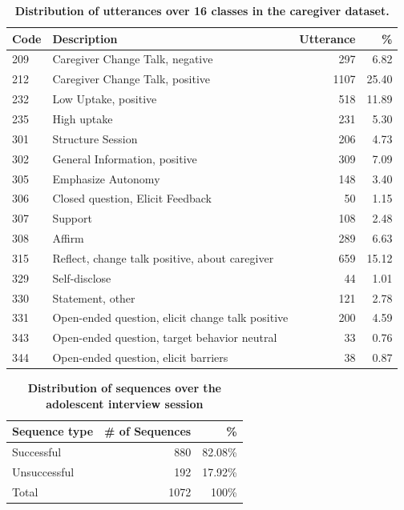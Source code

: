 \documentclass{amia}
\begin{document}
\begin{table}[htb!]
\caption{\textbf{Distribution of utterances over 16 classes in the caregiver dataset.}}    
\label{table:01}
\centering
\begin{tabular}{lp{7cm}rr}
\hline
\hline
Code  & Description & Utterance & \% \\
\hline
209 &	Caregiver Change Talk, negative &	297 & 6.82 \\
212 &	Caregiver Change Talk, positive &	1107 & 25.40 \\
232 &	Low Uptake, positive &	518 & 11.89 \\
235 &	High uptake &	231 & 5.30 \\
301 &	Structure Session &	206 & 4.73 \\
302 &	General Information, positive &	309 & 7.09 \\
305 &	Emphasize Autonomy &	148 & 3.40 \\
306 &	Closed question, Elicit Feedback &	50 & 1.15 \\
307 &	Support &	108 & 2.48 \\
308 &	Affirm &	289 & 6.63 \\
315 &	Reflect, change talk positive, about caregiver &	659 & 15.12 \\
329 &	Self-disclose &	44 & 1.01 \\
330 &	Statement, other &	121 & 2.78 \\
331 &	Open-ended question, elicit change talk positive &	200 & 4.59 \\
343 &	Open-ended question, target behavior neutral &	33 & 0.76 \\
344 &	Open-ended question, elicit barriers &	38 & 0.87 \\
\hline
\hline
\end{tabular}
\end{table}

\begin{table}[htb!]
\caption{\textbf{Distribution of sequences over the adolescent interview session}} 
\label{table:0001}
\centering
\begin{tabular}{lrr}
\hline
\hline
Sequence type  & \# of Sequences & \% \\
\hline
Successful & 880 & 82.08\% \\
Unsuccessful & 192 & 17.92\% \\
Total & 1072 & 100\% \\
\hline
\hline
\end{tabular}
\end{table} 
\end{document}
